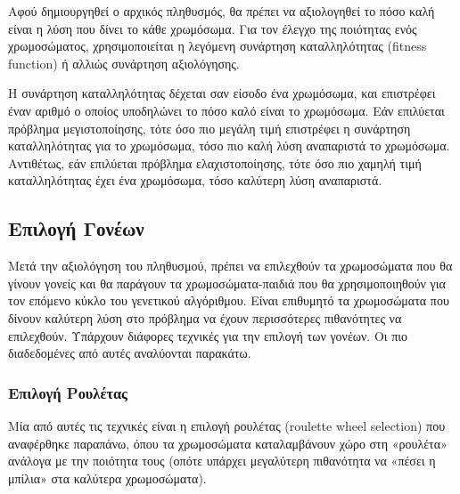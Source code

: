 Αφού δημιουργηθεί ο αρχικός πληθυσμός, θα πρέπει να αξιολογηθεί το πόσο καλή είναι η λύση που δίνει το κάθε χρωμόσωμα. Για τον έλεγχο της ποιότητας ενός χρωμοσώματος, χρησιμοποιείται η λεγόμενη συνάρτηση καταλληλότητας (fitness function) ή αλλιώς συνάρτηση αξιολόγησης.

Η συνάρτηση καταλληλότητας δέχεται σαν είσοδο ένα χρωμόσωμα, και επιστρέφει έναν αριθμό ο οποίος υποδηλώνει το πόσο καλό είναι το χρωμόσωμα. Εάν επιλύεται πρόβλημα μεγιστοποίησης, τότε όσο πιο μεγάλη τιμή επιστρέφει η συνάρτηση καταλληλότητας για το χρωμόσωμα, τόσο πιο καλή λύση αναπαριστά το χρωμόσωμα. Αντιθέτως, εάν επιλύεται πρόβλημα ελαχιστοποίησης, τότε όσο πιο χαμηλή τιμή καταλληλότητας έχει ένα χρωμόσωμα, τόσο καλύτερη λύση αναπαριστά.

\subsection{Επιλογή Γονέων}

Μετά την αξιολόγηση του πληθυσμού, πρέπει να επιλεχθούν τα χρωμοσώματα που θα γίνουν γονείς και θα παράγουν τα χρωμοσώματα-παιδιά που θα χρησιμοποιηθούν για τον επόμενο κύκλο του γενετικού αλγόριθμου. Είναι επιθυμητό τα χρωμοσώματα που δίνουν καλύτερη λύση στο πρόβλημα να έχουν περισσότερες πιθανότητες να επιλεχθούν. Υπάρχουν διάφορες τεχνικές για την επιλογή των γονέων. Οι πιο διαδεδομένες από αυτές αναλύονται παρακάτω.

\subsubsection{Επιλογή Ρουλέτας}

Μία από αυτές τις τεχνικές είναι η επιλογή ρουλέτας (roulette wheel selection) που αναφέρθηκε παραπάνω, όπου τα χρωμοσώματα καταλαμβάνουν χώρο στη «ρουλέτα» ανάλογα με την ποιότητα τους (οπότε υπάρχει μεγαλύτερη πιθανότητα να «πέσει η μπίλια» στα καλύτερα χρωμοσώματα).

